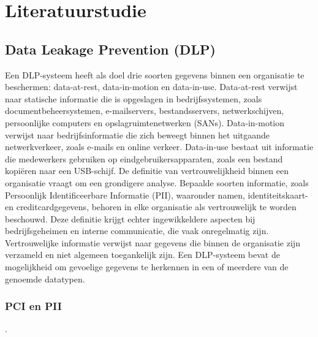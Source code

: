 


\section{Literatuurstudie}%
\label{sec:literatuurstudie}

\subsection{Data Leakage Prevention (DLP)}%

Een DLP-systeem heeft als doel drie soorten gegevens binnen een organisatie te beschermen: data-at-rest, data-in-motion en data-in-use. Data-at-rest verwijst naar statische informatie die is opgeslagen in bedrijfssystemen, zoals documentbeheersystemen, e-mailservers, bestandsservers, netwerkschijven, persoonlijke computers en opslagruimtenetwerken (SANs). Data-in-motion verwijst naar bedrijfsinformatie die zich beweegt binnen het uitgaande netwerkverkeer, zoals e-mails en online verkeer. Data-in-use bestaat uit informatie die medewerkers gebruiken op eindgebruikersapparaten, zoals een bestand kopiëren naar een USB-schijf. De definitie van vertrouwelijkheid binnen een organisatie vraagt om een grondigere analyse. Bepaalde soorten informatie, zoals Persoonlijk Identificeerbare Informatie (PII), waaronder namen, identiteitskaart- en creditcardgegevens, behoren in elke organisatie als vertrouwelijk te worden beschouwd. Deze definitie krijgt echter ingewikkeldere aspecten bij bedrijfsgeheimen en interne communicatie, die vaak onregelmatig zijn. Vertrouwelijke informatie verwijst naar gegevens die binnen de organisatie zijn verzameld en niet algemeen toegankelijk zijn. Een DLP-systeem bevat de mogelijkheid om gevoelige gegevens te herkennen in een of meerdere van de genoemde datatypen.


\subsubsection{PCI en PII}
.

